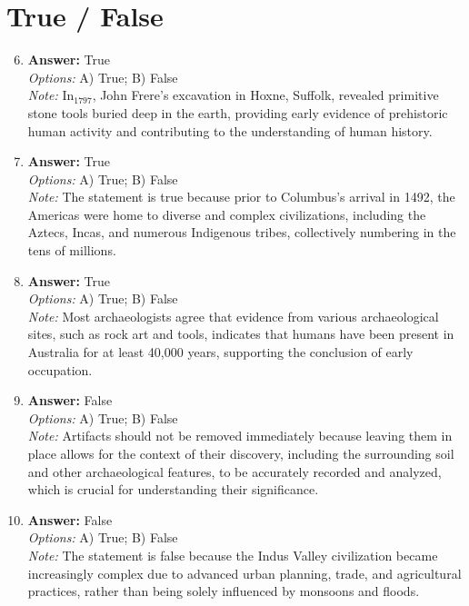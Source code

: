 \documentclass[12pt]{article}
\begin{document}
\section*{True / False}
\begin{enumerate}[label=\arabic*.]
\setcounter{enumi}{5}
\item \textbf{Answer:} True
\\ \textit{Options:} A) True; B) False
\\ \textit{Note:} In$_{1797}$, John Frere's excavation in Hoxne, Suffolk, revealed primitive stone tools buried deep in the earth, providing early evidence of prehistoric human activity and contributing to the understanding of human history.
\item \textbf{Answer:} True
\\ \textit{Options:} A) True; B) False
\\ \textit{Note:} The statement is true because prior to Columbus's arrival in 1492, the Americas were home to diverse and complex civilizations, including the Aztecs, Incas, and numerous Indigenous tribes, collectively numbering in the tens of millions.
\item \textbf{Answer:} True
\\ \textit{Options:} A) True; B) False
\\ \textit{Note:} Most archaeologists agree that evidence from various archaeological sites, such as rock art and tools, indicates that humans have been present in Australia for at least 40,000 years, supporting the conclusion of early occupation.
\item \textbf{Answer:} False
\\ \textit{Options:} A) True; B) False
\\ \textit{Note:} Artifacts should not be removed immediately because leaving them in place allows for the context of their discovery, including the surrounding soil and other archaeological features, to be accurately recorded and analyzed, which is crucial for understanding their significance.
\item \textbf{Answer:} False
\\ \textit{Options:} A) True; B) False
\\ \textit{Note:} The statement is false because the Indus Valley civilization became increasingly complex due to advanced urban planning, trade, and agricultural practices, rather than being solely influenced by monsoons and floods.
\end{enumerate}
\end{document}
